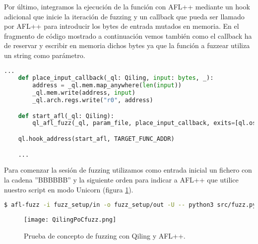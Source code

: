 Por último, integramos la ejecución de la función con AFL++ mediante un hook adicional que inicie la iteración de fuzzing y un callback que pueda ser 
llamado por AFL++ para introducir los bytes de entrada mutados en memoria. En el fragmento de código mostrado a continuación vemos también como el callback ha de 
reservar y escribir en memoria dichos bytes ya que la función a fuzzear utiliza un string como parámetro.

\begin{lstlisting}[language=python, caption=Integración de AFL++ con nuestro script de Qiling., captionpos=b,
    frame=single, breaklines]
    ...
    def place_input_callback(_ql: Qiling, input: bytes, _):
        address = _ql.mem.map_anywhere(len(input))
        _ql.mem.write(address, input)
        _ql.arch.regs.write("r0", address)

    def start_afl(_ql: Qiling):
        ql_afl_fuzz(_ql, param_file, place_input_callback, exits=[ql.os.exit_point])

    ql.hook_address(start_afl, TARGET_FUNC_ADDR)

    ...
\end{lstlisting}

Para comenzar la sesión de fuzzing utilizamos como entrada inicial un fichero con la cadena ''BBBBBB'' y la siguiente orden para 
indicar a AFL++ que utilice nuestro script en modo Unicorn (figura \ref{fig:QilingPoCfuzz}). 

\begin{lstlisting}[language=bash]
    $ afl-fuzz -i fuzz_setup/in -o fuzz_setup/out -U -- python3 src/fuzz.py @@
\end{lstlisting}

\begin{figure}[H]
    \centering
    \texttt{[image: QilingPoCfuzz.png]}
    \caption{Prueba de concepto de fuzzing con Qiling y AFL++.}
    \label{fig:QilingPoCfuzz}
\end{figure}

